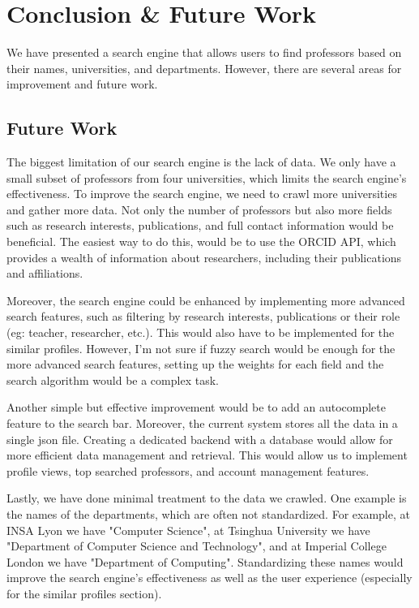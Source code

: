 \section{Conclusion \& Future Work}

We have presented a search engine that allows users to find professors based on their names, universities, and departments. However, there are several areas for improvement and future work.

\subsection{Future Work}

The biggest limitation of our search engine is the lack of data. We only have a small subset of professors from four universities, which limits the search engine's effectiveness. To improve the search engine, we need to crawl more universities and gather more data. Not only the number of professors but also more fields such as research interests, publications, and full contact information would be beneficial. The easiest way to do this, would be to use the ORCID API, which provides a wealth of information about researchers, including their publications and affiliations.

Moreover, the search engine could be enhanced by implementing more advanced search features, such as filtering by research interests, publications or their role (eg: teacher, researcher, etc.). This would also have to be implemented for the similar profiles. However, I'm not sure if fuzzy search would be enough for the more advanced search features, setting up the weights for each field and the search algorithm would be a complex task.

Another simple but effective improvement would be to add an autocomplete feature to the search bar. Moreover, the current system stores all the data in a single json file. Creating a dedicated backend with a database would allow for more efficient data management and retrieval. This would allow us to implement profile views, top searched professors, and account management features.

Lastly, we have done minimal treatment to the data we crawled. One example is the names of the departments, which are often not standardized. For example, at INSA Lyon we have "Computer Science", at Tsinghua University we have "Department of Computer Science and Technology", and at Imperial College London we have "Department of Computing". Standardizing these names would improve the search engine's effectiveness as well as the user experience (especially for the similar profiles section).

